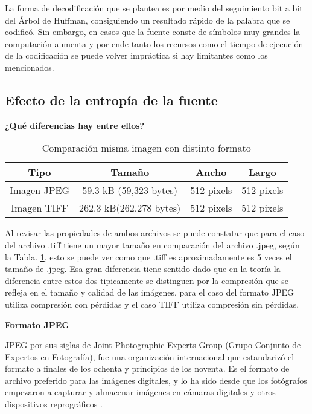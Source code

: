 \documentclass[conference,onecolumn,12pt]{IEEEtran}
\numberwithin{equation}{subsection}
\begin{document}
La forma de decodificación que se plantea es por medio del seguimiento bit a bit del Árbol de Huffman, consiguiendo un resultado rápido de la palabra que se codificó. Sin embargo, en casos que la fuente conste de símbolos muy grandes la computación aumenta y por ende tanto los recursos como el tiempo de ejecución de la codificación se puede volver impráctica si hay limitantes como los mencionados.










\subsection{Efecto de la entropía de la fuente}
\textbf{¿Qué diferencias hay entre ellos? }

\begin{table}[h!]
    \centering
    \caption{Comparación misma imagen con distinto formato }
    \label{tab:jpeg_vs_tiff}
    \begin{tabular}{cccc}
    \toprule
    \textbf{Tipo} & \textbf{Tamaño} & \textbf{Ancho} & \textbf{Largo} \\
    \midrule
    Imagen JPEG & 59.3 kB (59,323 bytes) & 512 pixels & 512 pixels \\
    Imagen TIFF & 262.3 kB(262,278 bytes)& 512 pixels & 512 pixels \\
    \bottomrule
    \end{tabular}
\end{table}


Al revisar las propiedades de ambos  archivos se puede constatar que para el caso del archivo .tiff tiene un mayor tamaño en comparación del archivo .jpeg, según la Tabla. \ref{tab:jpeg_vs_tiff}, esto se puede ver como que .tiff es aproximadamente es 5 veces el tamaño de .jpeg. Esa gran diferencia tiene sentido dado que en la teoría la diferencia entre estos dos tipicamente se distinguen por la compresión que se refleja en el tamaño y calidad de las imágenes, para el caso del formato JPEG utiliza compresión con pérdidas y el caso TIFF utiliza compresión sin pérdidas.


\textbf{Formato JPEG}

JPEG por sus siglas de Joint Photographic Experts Group (Grupo Conjunto de Expertos en Fotografía), fue una organización internacional que estandarizó el formato a finales de los ochenta y principios de los noventa. Es el formato de archivo preferido para las imágenes digitales, y lo ha sido desde que los fotógrafos empezaron a capturar y almacenar imágenes en cámaras digitales y otros dispositivos reprográficos \cite{jpeg}.
\end{document}
